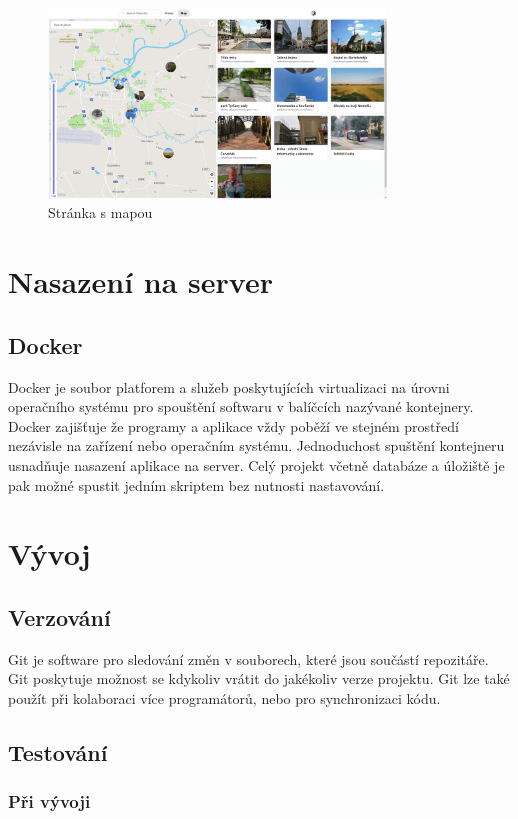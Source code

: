 \documentclass[12pt, a4paper,
 twoside,        %
 openright
]{report}
\begin{document}
\begin{figure}[h]
	\centering
	\includegraphics[width=0.8\textwidth]{images/map_page.png}
	\caption{Stránka s mapou}
\end{figure}

\chapter{Nasazení na server}
\section{Docker}
Docker je soubor platforem a služeb poskytujících virtualizaci na úrovni operačního systému pro spouštění softwaru v balíčcích nazývané kontejnery. Docker zajišťuje že programy a aplikace vždy poběží ve stejném prostředí nezávisle na zařízení nebo operačním systému. Jednoduchost spuštění kontejneru usnadňuje nasazení aplikace na server. Celý projekt včetně databáze a úložiště je pak možné spustit jedním skriptem bez nutnosti nastavování.

\chapter{Vývoj}
\section{Verzování}
Git je software pro sledování změn v souborech, které jsou součástí repozitáře. Git poskytuje možnost se kdykoliv vrátit do jakékoliv verze projektu. Git lze také použít při kolaboraci více programátorů, nebo pro synchronizaci kódu.
\section{Testování}
\subsection{Při vývoji}  
\end{document}
